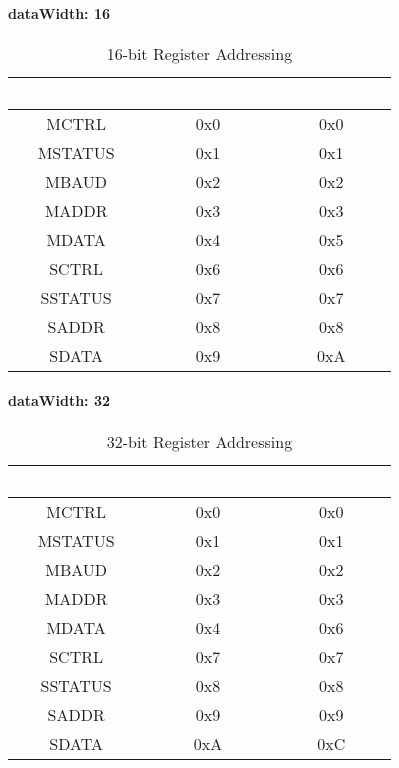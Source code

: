  \paragraph{dataWidth: 16}
  \begin{table}[H]
    \centering
    \begin{tabular}{|c|c|c|}
      \hline
      \rowcolor{darkgray}  %
      \textcolor{white}{\textbf{Register Name}} & \textcolor{white}{\textbf{Address Start}} & \textcolor{white}{\textbf{Address End}} \\ \hline
      MCTRL & 0x0 & 0x0 \\ \hline
      MSTATUS & 0x1 & 0x1 \\ \hline
      MBAUD & 0x2 & 0x2 \\ \hline
      MADDR & 0x3 & 0x3 \\ \hline
      MDATA & 0x4 & 0x5 \\ \hline
      SCTRL & 0x6 & 0x6 \\ \hline
      SSTATUS & 0x7 & 0x7 \\ \hline
      SADDR & 0x8 & 0x8 \\ \hline
      SDATA & 0x9 & 0xA \\ \hline
    \end{tabular}
    \caption{16-bit Register Addressing}
  \end{table}
  
  \paragraph{dataWidth: 32}
  \begin{table}[H]
    \centering
    \begin{tabular}{|c|c|c|}
      \hline
      \rowcolor{darkgray}  %
      \textcolor{white}{\textbf{Register Name}} & \textcolor{white}{\textbf{Address Start}} & \textcolor{white}{\textbf{Address End}} \\ \hline
      MCTRL & 0x0 & 0x0 \\ \hline
      MSTATUS & 0x1 & 0x1 \\ \hline
      MBAUD & 0x2 & 0x2 \\ \hline
      MADDR & 0x3 & 0x3 \\ \hline
      MDATA & 0x4 & 0x6 \\ \hline
      SCTRL & 0x7 & 0x7 \\ \hline
      SSTATUS & 0x8 & 0x8 \\ \hline
      SADDR & 0x9 & 0x9 \\ \hline
      SDATA & 0xA & 0xC \\ \hline
    \end{tabular}
    \caption{32-bit Register Addressing}
  \end{table}